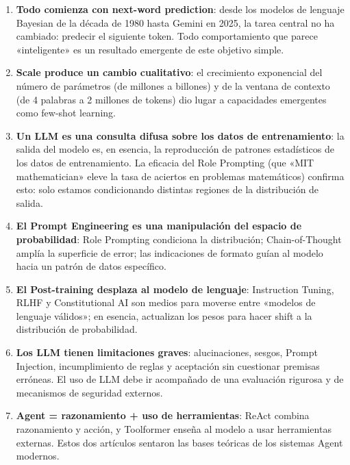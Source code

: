 \documentclass[a4paper]{article}
\begin{document}
\begin{enumerate}
    \item \textbf{Todo comienza con next-word prediction}: desde los modelos de lenguaje Bayesian de la década de 1980 hasta Gemini en 2025, la tarea central no ha cambiado: predecir el siguiente token. Todo comportamiento que parece «inteligente» es un resultado emergente de este objetivo simple.

    \item \textbf{Scale produce un cambio cualitativo}: el crecimiento exponencial del número de parámetros (de millones a billones) y de la ventana de contexto (de 4 palabras a 2 millones de tokens) dio lugar a capacidades emergentes como few-shot learning.

    \item \textbf{Un LLM es una consulta difusa sobre los datos de entrenamiento}: la salida del modelo es, en esencia, la reproducción de patrones estadísticos de los datos de entrenamiento. La eficacia del Role Prompting (que «MIT mathematician» eleve la tasa de aciertos en problemas matemáticos) confirma esto: solo estamos condicionando distintas regiones de la distribución de salida.

    \item \textbf{El Prompt Engineering es una manipulación del espacio de probabilidad}: Role Prompting condiciona la distribución; Chain-of-Thought amplía la superficie de error; las indicaciones de formato guían al modelo hacia un patrón de datos específico.

    \item \textbf{El Post-training desplaza al modelo de lenguaje}: Instruction Tuning, RLHF y Constitutional AI son medios para moverse entre «modelos de lenguaje válidos»; en esencia, actualizan los pesos para hacer shift a la distribución de probabilidad.

    \item \textbf{Los LLM tienen limitaciones graves}: alucinaciones, sesgos, Prompt Injection, incumplimiento de reglas y aceptación sin cuestionar premisas erróneas. El uso de LLM debe ir acompañado de una evaluación rigurosa y de mecanismos de seguridad externos.

    \item \textbf{Agent = razonamiento + uso de herramientas}: ReAct combina razonamiento y acción, y Toolformer enseña al modelo a usar herramientas externas. Estos dos artículos sentaron las bases teóricas de los sistemas Agent modernos.
\end{enumerate}
\end{document}
